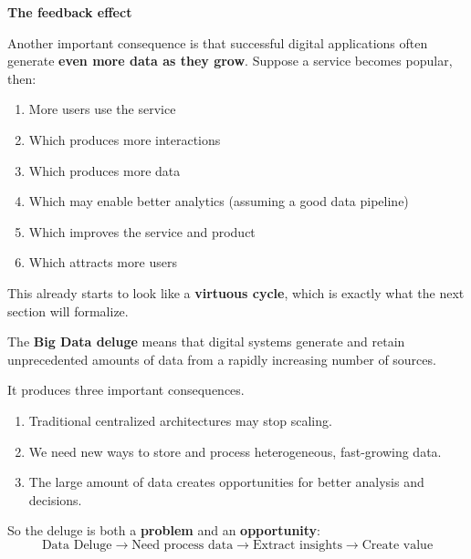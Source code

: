 \highspace
\begin{flushleft}
    \textcolor{Green3}{ \textbf{The feedback effect}}
\end{flushleft}
Another important consequence is that successful digital applications often generate \textbf{even more data as they grow}. Suppose a service becomes popular, then:
\begin{enumerate}
    \item More users use the service
    \item Which produces more interactions
    \item Which produces more data
    \item Which may enable better analytics (assuming a good data pipeline)
    \item Which improves the service and product
    \item Which attracts more users
\end{enumerate}
This already starts to look like a \textbf{virtuous cycle}, which is exactly what the next section will formalize.

\highspace
\begin{takeawaysbox}
    The \textbf{Big Data deluge} means that digital systems generate and retain unprecedented amounts of data from a rapidly increasing number of sources.

    \highspace
    It produces three important consequences.
    \begin{enumerate}
        \item Traditional centralized architectures may stop scaling.
        \item We need new ways to store and process heterogeneous, fast-growing data.
        \item The large amount of data creates opportunities for better analysis and decisions.
    \end{enumerate}
    So the deluge is both a \textbf{problem} and an \textbf{opportunity}:
    \begin{equation*}
        \text{Data Deluge}
        \rightarrow
        \text{Need process data}
        \rightarrow
        \text{Extract insights}
        \rightarrow
        \text{Create value}
    \end{equation*}
\end{takeawaysbox}
